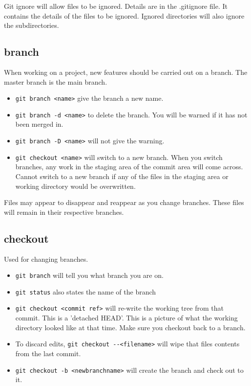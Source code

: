 \documentclass[11pt]{article} %
\begin{document}
Git ignore will allow files to be ignored.  Details are in the .gitignore file.  It contains the details of the files to be ignored. Ignored directories will also ignore the subdirectories. 

\subsection*{branch}
When working on a project, new features should be carried out on a branch. The master branch is the main branch.  
\begin{itemize}
\item \lstinline{git branch <name>} give the branch a new name. 
\item \lstinline{git branch -d <name>} to delete the branch.  You will be warned if it has not been merged in. 
\item \lstinline{git branch -D <name>} will not give the warning. 
\item \lstinline{git checkout <name>} will switch to a new branch. When you switch branches, any work in the staging area of the commit area will come across. Cannot switch to a new branch if any of the files in the staging area or working directory would be overwritten.  
\end{itemize}
Files may appear to disappear and reappear as you change branches.  These files will remain in their respective branches. 

\subsection{checkout}
Used for changing branches. 
\begin{itemize}
\item \lstinline{git branch} will tell you what branch you are on.
\item \lstinline{git status} also states the name of the branch
\item \lstinline{git checkout <commit ref>} will re-write the working tree from that commit. This is a 'detached HEAD'. This is a picture of what the working directory looked like at that time. Make sure you checkout back to a branch. 
\item To discard edits, \lstinline{git checkout --<filename>} will wipe that files contents from the last commit. 
\item \lstinline{git checkout -b <newbranchname>} will create the branch and check out to it.
\end{itemize}
\end{document}
